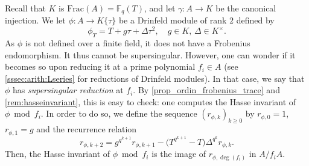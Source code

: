 \documentclass[11pt]{article}
\theoremstyle{definition}
\renewcommand\geq{\geqslant}
\newcommand\Fq{\mathbb{F}_q}
\begin{document}
Recall that $K$ is $\mathrm{Frac}(A) = \Fq(T)$, and let $\gamma: A \to K$ be
the canonical injection. We let $\phi : A \to K\{\tau\}$ be a Drinfeld module 
of rank $2$ defined by
$$\phi_T = T + g\tau + \Delta \tau^2, \quad g \in K, \, \Delta \in K^\times.$$
As $\phi$ is not defined over a finite field, it does not have a
Frobenius endomorphism. It thus cannot be supersingular. However, one can
wonder if it becomes so upon reducing it at a prime polynomial $f_i \in A$ (see
\cref{sssec:arith:Lseries} for reductions of Drinfeld modules). In that case,
we say that $\phi$ has \emph{supersingular reduction} at $f_i$. By
\cref{prop_ordin_frobenius_trace} and \cref{rem:hasseinvariant}, this is
easy to check: one computes the Hasse invariant of $\phi \bmod{f_i}$. 
In order to do so, we define the sequence $(r_{\phi, k})_{k \geq 0}$ by
$r_{\phi, 0} = 1$, $r_{\phi, 1} = g$ and the recurrence relation
\[
  r_{\phi, k+2} =   g^{q^{k+1}} r_{\phi, k+1}
                  - \big(T^{q^{k+1}} - T\big) \Delta^{q^k} r_{\phi, k}.
\]
Then, the Hasse invariant of $\phi \bmod{f_i}$ is the image of 
$r_{\phi, \deg(f_i)}$ in $A/f_i A$.
\end{document}
